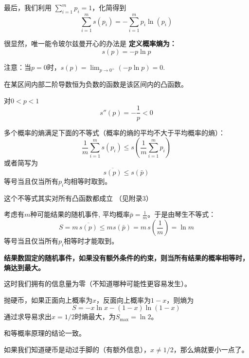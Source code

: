 \documentclass[CJK]{beamer}
\begin{document}
\begin{frame}
\bchL
最后，我们利用 $\sum_{i=1}^m p_i = 1$，化简得到
$$\sum_{i=1}^m s(p_i) = -\sum_{i=1}^m p_i \ln (p_i) $$

很显然，唯一能令玻尔兹曼开心的办法是{\blue \bf
定义概率熵为：
$$s(p) = - p \ln p$$
}

\skipline

注意：当$p=0$时，$s(p) = \lim_{p\rightarrow 0^+} (-p\ln p) = 0$.


\echL
\end{frame}



\begin{frame}
\bchL
{}
\emini
{}
在某区间内部二阶导数恒为负数的函数是该区间内的凸函数。

对$0<p<1$
$$s''(p)  = -\frac{1}{p}<0$$
\emini
\echL
\end{frame}


\begin{frame}
\bchL
多个概率的熵满足下面的不等式（{\blue 概率的熵的平均不大于平均概率的熵}）：
$$\frac{1}{m}\sum_{i=1}^m s(p_i) \le  s\left(\frac{1}{m}\sum_{i=1}^m p_i\right)$$
或者简写为{\blue
$$\overline{s(p)} \le s(\bar{p})$$
等号当且仅当所有$p_i$均相等时取到}。


这个不等式其实对所有凸函数都成立 （见附录3）
\echL
\end{frame}


\begin{frame}
\bchL
考虑有$m$种可能结果的随机事件, 平均概率$\bar{p} =  \frac{1}{m}$。于是由琴生不等式：
$$ S = m\, \overline{s(p)} \le m s(\bar{p}) = m\, s\left(\frac{1}{m}\right) = \ln m$$
等号当且仅当所有$p_i$相等时才能取到。

\skipline

{\bf \blue 结果数固定的随机事件，如果没有额外条件的约束，则当所有结果的概率相等时，熵达到最大。}

这时我们拥有的信息量为零（不知道哪种可能性更容易发生）。

\echL
\end{frame}



\begin{frame}
\bchL

\emini
{}
抛硬币，如果正面向上概率为$x$，反面向上概率为$1-x$，则熵为
$$S = -x\ln x - (1-x)\ln (1-x)$$
通过求导易求出$x = 1/2$时熵最大，为$S_{\max} = \ln 2$。

和等概率原理的结论一致。
\emini

\skiplines

如果我们知道硬币是动过手脚的（有额外信息），$x\ne 1/2$，那么熵就要小一点了。
\echL
\end{frame}
\end{document}
